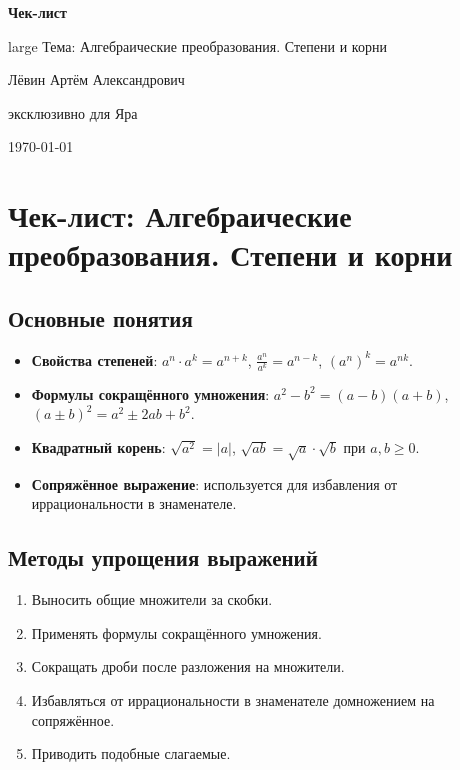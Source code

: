 \documentclass[a4paper,12pt]{article}
\begin{document}
\begin{titlepage}
\centering
\vspace*{2cm}
{\Large\bfseries\color{darkaccent} Чек-лист}\par
\vspace{0.5cm}
{{large Тема: Алгебраические преобразования. Степени и корни}}\par
\vspace{2cm}
{\large Лёвин Артём Александрович}\par
{\large эксклюзивно для Яра}\par
\vspace{2cm}
{\today}\par
\vfill
{}
\vspace{1cm}
\end{titlepage}

\section*{Чек-лист: Алгебраические преобразования. Степени и корни}

\subsection*{Основные понятия}
\begin{itemize}[leftmargin=*]
\item \textbf{Свойства степеней}: $a^n \cdot a^k = a^{n+k}$, $\frac{a^n}{a^k} = a^{n-k}$, $(a^n)^k = a^{nk}$.
\item \textbf{Формулы сокращённого умножения}: 
$a^2 - b^2 = (a-b)(a+b)$, $(a\pm b)^2 = a^2 \pm 2ab + b^2$.
\item \textbf{Квадратный корень}: $\sqrt{a^2} = |a|$, $\sqrt{ab} = \sqrt{a}\cdot\sqrt{b}$ при $a,b \geq 0$.
\item \textbf{Сопряжённое выражение}: используется для избавления от иррациональности в знаменателе.
\end{itemize}

\subsection*{Методы упрощения выражений}
\begin{enumerate}[leftmargin=*]
\item Выносить общие множители за скобки.
\item Применять формулы сокращённого умножения.
\item Сокращать дроби после разложения на множители.
\item Избавляться от иррациональности в знаменателе домножением на сопряжённое.
\item Приводить подобные слагаемые.
\end{enumerate}
\end{document}
